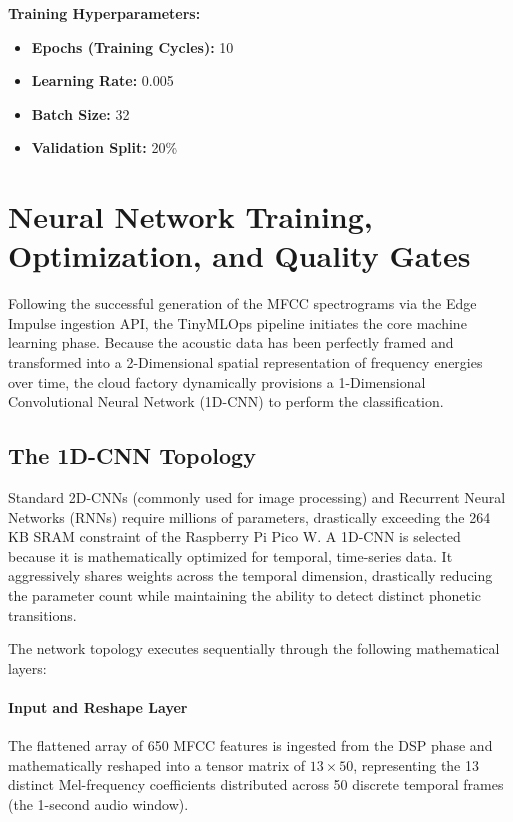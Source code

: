 \documentclass[11pt,a4paper,openany]{book}
\begin{document}
\FloatBarrier

\noindent \textbf{Training Hyperparameters:}
\begin{itemize}
    \item \textbf{Epochs (Training Cycles):} 10
    \item \textbf{Learning Rate:} 0.005
    \item \textbf{Batch Size:} 32
    \item \textbf{Validation Split:} 20\%
\end{itemize}

\section{Neural Network Training, Optimization, and Quality Gates}
Following the successful generation of the MFCC spectrograms via the Edge Impulse ingestion API, the TinyMLOps pipeline initiates the core machine learning phase. Because the acoustic data has been perfectly framed and transformed into a 2-Dimensional spatial representation of frequency energies over time, the cloud factory dynamically provisions a 1-Dimensional Convolutional Neural Network (1D-CNN) to perform the classification.

\subsection{The 1D-CNN Topology}
Standard 2D-CNNs (commonly used for image processing) and Recurrent Neural Networks (RNNs) require millions of parameters, drastically exceeding the 264 KB SRAM constraint of the Raspberry Pi Pico W. A 1D-CNN is selected because it is mathematically optimized for temporal, time-series data. It aggressively shares weights across the temporal dimension, drastically reducing the parameter count while maintaining the ability to detect distinct phonetic transitions.

The network topology executes sequentially through the following mathematical layers:

\paragraph{Input and Reshape Layer}
The flattened array of 650 MFCC features is ingested from the DSP phase and mathematically reshaped into a tensor matrix of $13 \times 50$, representing the 13 distinct Mel-frequency coefficients distributed across 50 discrete temporal frames (the 1-second audio window).
\end{document}

